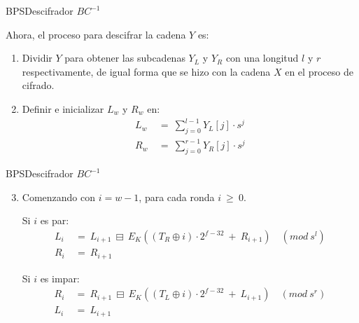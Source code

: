 \begin{frame}{BPS}{Descifrador $BC^{-1}$}

  Ahora, el proceso para descifrar la cadena $Y$ es:

  \begin{enumerate}
    \item Dividir $Y$ para obtener las subcadenas $Y_L$ y $Y_R$ con una 
      longitud $l$ y $r$ respectivamente, de igual forma que se hizo con 
      la cadena $X$ en el proceso de cifrado.    

    \item Definir e inicializar $L_w$ y $R_w$ en:
      \begin{align}
        L_w\: &=\: \sum_{j=0}^{l-1} Y_L[j] \cdot s^j \\
        R_w\: &=\: \sum_{j=0}^{r-1} Y_R[j] \cdot s^j
      \end{align}
  \end{enumerate}
\end{frame}

\begin{frame}{BPS}{Descifrador $BC^{-1}$}

  \begin{enumerate}
    \setcounter{enumi}{2}
    \item Comenzando con $i=w-1$, para cada ronda $i\: \geq\: 0$.

    Si $i$ es par:
    \begin{align}
      L_i\: &=\: L_{i+1}\: \boxminus\: 
                E_K((T_R \oplus i) \cdot 2^{f-32}\: +\: R_{i+1})\quad 
                (mod\ s^l) \\
      R_i\: &=\: R_{i+1}
    \end{align}

    Si $i$ es impar:
    \begin{align}
      R_i\: &=\: R_{i+1}\: \boxminus\: 
                E_K((T_L \oplus i) \cdot 2^{f-32}\: +\: L_{i+1})\quad 
                (mod\ s^r) \\
      L_i\: &=\: L_{i+1}
    \end{align}

  \end{enumerate}
\end{frame}

